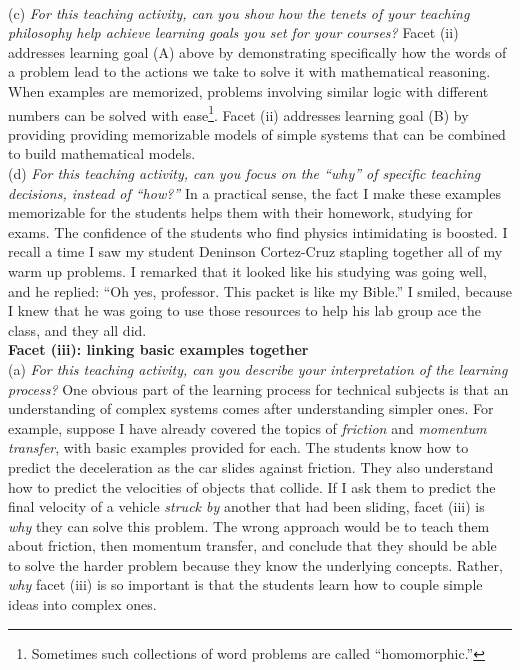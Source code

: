 \documentclass[../../../main.tex]{subfiles}
\begin{document}
\\
\vspace{0.25cm}
(c) \textit{For this teaching activity, can you show how the tenets of your teaching philosophy help achieve learning goals you set for your courses?}  Facet (ii) addresses learning goal (A) above by demonstrating specifically how the words of a problem lead to the actions we take to solve it with mathematical reasoning.  When examples are memorized, problems involving similar logic with different numbers can be solved with ease\footnote{Sometimes such collections of word problems are called ``homomorphic.''}.  Facet (ii) addresses learning goal (B) by providing providing memorizable models of simple systems that can be combined to build mathematical models.
\\
\vspace{0.25cm}
(d) \textit{For this teaching activity, can you focus on the ``why'' of specific teaching decisions, instead of ``how?''} In a practical sense, the fact I make these examples memorizable for the students helps them with their homework, studying for exams.  The confidence of the students who find physics intimidating is boosted.  I recall a time I saw my student Deninson Cortez-Cruz stapling together all of my warm up problems.  I remarked that it looked like his studying was going well, and he replied: ``Oh yes, professor.  This packet is like my Bible.''  I smiled, because I knew that he was going to use those resources to help his lab group ace the class, and they all did.
\\
\vspace{0.25cm}
\textbf{Facet (iii): linking basic examples together}
\\
\vspace{0.25cm}
(a) \textit{For this teaching activity, can you describe your interpretation of the learning process?} One obvious part of the learning process for technical subjects is that an understanding of complex systems comes after understanding simpler ones.  For example, suppose I have already covered the topics of \textit{friction} and \textit{momentum transfer}, with basic examples provided for each.  The students know how to predict the deceleration as the car slides against friction.  They also understand how to predict the velocities of objects that collide.  If I ask them to predict the final velocity of a vehicle \textit{struck by} another that had been sliding, facet (iii) is \textit{why} they can solve this problem.  The wrong approach would be to teach them about friction, then momentum transfer, and conclude that they should be able to solve the harder problem because they know the underlying concepts.  Rather, \textit{why} facet (iii) is so important is that the students learn how to couple simple ideas into complex ones.
\end{document}
